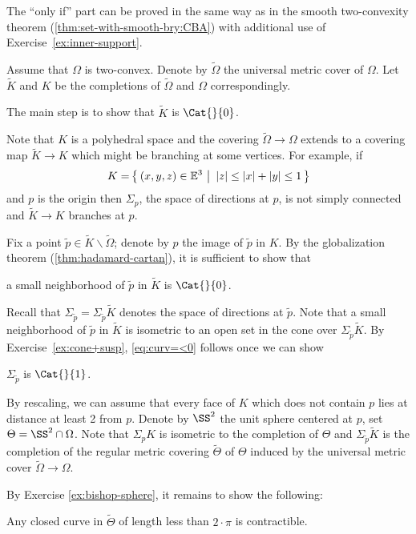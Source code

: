 The ``only if'' part can be proved in the same way as in the smooth two-convexity theorem (\ref{thm:set-with-smooth-bry:CBA}) with additional use of Exercise~\ref{ex:inner-support}.


Assume that $\Omega$ is two-convex.
Denote by $\tilde\Omega$ the universal metric cover of $\Omega$.
Let $\tilde K$ and $K$ be the completions of $\tilde\Omega$ and  $\Omega$ correspondingly.

The main step is to show that $\tilde K$ is $\Cat{}{0}$. 

Note that $K$ is a polyhedral space and the covering $\tilde\Omega\to\Omega$ extends to a covering map $\tilde K\to K$ which might be branching at some vertices.
For example, if \[K=\set{(x,y,z)\in\EE^3}{|z|\le |x|+|y|\le 1}\] and $p$ is the origin then $\Sigma_p$,
the space of directions at $p$,
is not simply connected and $\tilde K\to K$ branches at $p$.


Fix a point $\tilde p\in \tilde K\backslash\tilde\Omega$; 
denote by $p$ the image of $\tilde p$ in $K$.
By the globalization theorem (\ref{thm:hadamard-cartan}), it is sufficient to show that

\begin{clm}{}\label{eq:curv=<0}
a small neighborhood of $\tilde p$ in $\tilde K$ is $\Cat{}{0}$.
\end{clm}

Recall that $\Sigma_{\tilde p}=\Sigma_{\tilde p}\tilde K$ denotes the space of directions at $\tilde p$.
Note that a small neighborhood of $\tilde p$ in $\tilde K$
is isometric to an open set in the cone over $\Sigma_{\tilde p}\tilde K$.
By Exercise~\ref{ex:cone+susp}, \ref{eq:curv=<0} follows once we can show 

\begin{clm}{}\label{eq:curv=<1}
$\Sigma_{\tilde p}$ is $\Cat{}{1}$.
\end{clm}

By  rescaling, we can assume that every face of $K$ which does not contain $p$ lies at distance at least 2 from $p$.
Denote by $\SS^2$ the unit sphere centered at $p$,
set $\Theta=\SS^2\cap\Omega$.
Note that $\Sigma_pK$ is isometric to the completion of $\Theta$
and $\Sigma_{\tilde p}\tilde K$ is the completion of the regular metric covering $\tilde\Theta$ of $\Theta$  induced by the universal metric cover $\tilde \Omega\to \Omega$.

By Exercise \ref{ex:bishop-sphere}, it remains to show  the following:
\begin{clm}{}
Any closed curve in $\tilde\Theta$ of length less than $2\cdot\pi$ is contractible.
\end{clm}

